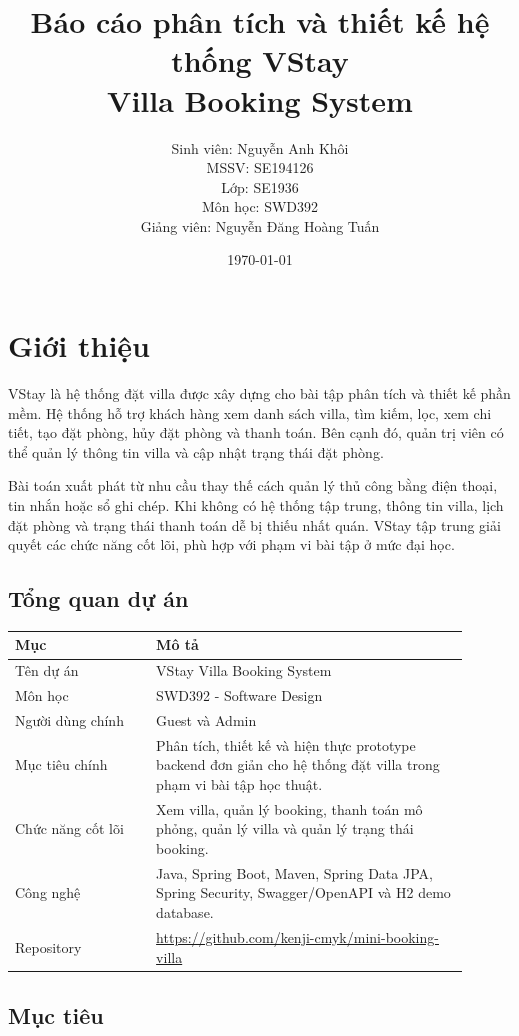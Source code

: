 \documentclass[12pt,a4paper]{article}
\title{\textbf{Báo cáo phân tích và thiết kế hệ thống VStay}\\
\large Villa Booking System}
\author{
Sinh viên: Nguyễn Anh Khôi\\
MSSV: SE194126\\
Lớp: SE1936\\
Môn học: SWD392\\
Giảng viên: Nguyễn Đăng Hoàng Tuấn
}
\date{\today}
\begin{document}
\maketitle
\tableofcontents
\newpage

\section{Giới thiệu}

VStay là hệ thống đặt villa được xây dựng cho bài tập phân tích và thiết kế phần mềm. Hệ thống hỗ trợ khách hàng xem danh sách villa, tìm kiếm, lọc, xem chi tiết, tạo đặt phòng, hủy đặt phòng và thanh toán. Bên cạnh đó, quản trị viên có thể quản lý thông tin villa và cập nhật trạng thái đặt phòng.

Bài toán xuất phát từ nhu cầu thay thế cách quản lý thủ công bằng điện thoại, tin nhắn hoặc sổ ghi chép. Khi không có hệ thống tập trung, thông tin villa, lịch đặt phòng và trạng thái thanh toán dễ bị thiếu nhất quán. VStay tập trung giải quyết các chức năng cốt lõi, phù hợp với phạm vi bài tập ở mức đại học.

\subsection{Tổng quan dự án}

\begin{longtable}{|p{0.28\linewidth}|p{0.62\linewidth}|}
\hline
\textbf{Mục} & \textbf{Mô tả} \\
\hline
Tên dự án & VStay Villa Booking System \\
\hline
Môn học & SWD392 - Software Design \\
\hline
Người dùng chính & Guest và Admin \\
\hline
Mục tiêu chính & Phân tích, thiết kế và hiện thực prototype backend đơn giản cho hệ thống đặt villa trong phạm vi bài tập học thuật. \\
\hline
Chức năng cốt lõi & Xem villa, quản lý booking, thanh toán mô phỏng, quản lý villa và quản lý trạng thái booking. \\
\hline
Công nghệ & Java, Spring Boot, Maven, Spring Data JPA, Spring Security, Swagger/OpenAPI và H2 demo database. \\
\hline
Repository & \href{https://github.com/kenji-cmyk/mini-booking-villa}{https://github.com/kenji-cmyk/mini-booking-villa} \\
\hline
\end{longtable}

\subsection{Mục tiêu}
\end{document}
